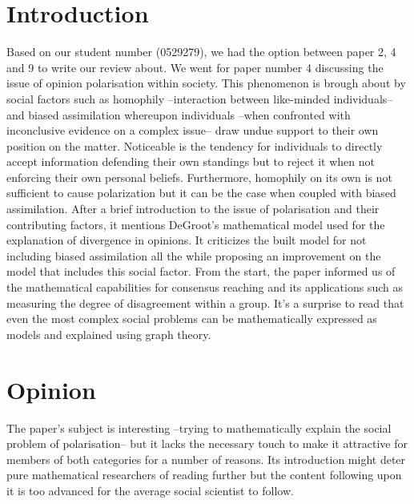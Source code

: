 \documentclass[14]{article}
\begin{document}
\author{\textbf{Faculty of Sciences and Bio-Engineering Sciences}\\[2\baselineskip]\newline\textbf{Arthur Chomé - 0529279}}

\date{ \LARGE Assignment 3: Review}
\title{\vspace{-6cm}}%

\maketitle

\section{Introduction}
Based on our student number (0529279), we had the option between paper 2, 4 and 9 to write our review about. We went for paper number 4\cite{dandekar2013biased} discussing the issue of opinion polarisation within society. 
This phenomenon is brough about by social factors such as homophily --interaction between like-minded individuals-- and biased assimilation whereupon individuals --when confronted with inconclusive evidence on a complex issue-- draw undue support to their own position on the matter. Noticeable is the tendency for individuals to directly accept information defending their own standings but to reject it when not enforcing their own personal beliefs. Furthermore, homophily on its own is not sufficient to cause polarization but it can be the case when coupled with biased assimilation.
\newline
After a brief introduction to the issue of polarisation and their contributing factors, it mentions DeGroot's mathematical model\cite{degroot1974reaching} used for the explanation of divergence in opinions. It criticizes the built model for not including biased assimilation all the while proposing an improvement on the model that includes this social factor. From the start, the paper informed us of the mathematical capabilities for consensus reaching and its applications such as measuring the degree of disagreement within a group. It's a surprise to read that even the most complex social problems can be mathematically expressed as models and explained using graph theory.

\section{Opinion}
The paper's subject is interesting --trying to mathematically explain the social problem of polarisation-- but it lacks the necessary touch to make it attractive for members of both categories for a number of reasons. Its introduction might deter pure mathematical researchers of reading further but the content following upon it is too advanced for the average social scientist to follow.
\end{document}
